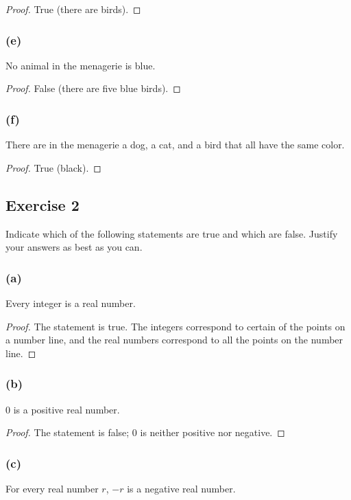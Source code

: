 \documentclass[14pt]{extarticle}
\begin{document}
\begin{proof}
    True (there are birds).
\end{proof}

\subsubsection{(e)}
No animal in the menagerie is blue.

\begin{proof}
    False (there are five blue birds).
\end{proof}

\subsubsection{(f)}
There are in the menagerie a dog, a cat, and a bird that all have the same color.

\begin{proof}
    True (black).
\end{proof}

\subsection{Exercise 2}
Indicate which of the following statements are true and which are false. Justify your answers as best as you can.

\subsubsection{(a)}
Every integer is a real number.

\begin{proof}
    The statement is true. The integers correspond to certain of the points on a number line, and the real numbers correspond to all the points on the number line.
\end{proof}

\subsubsection{(b)}
0 is a positive real number.

\begin{proof}
    The statement is false; 0 is neither positive nor negative.
\end{proof}

\subsubsection{(c)}
For every real number $r$, $-r$ is a negative real number.
\end{document}
